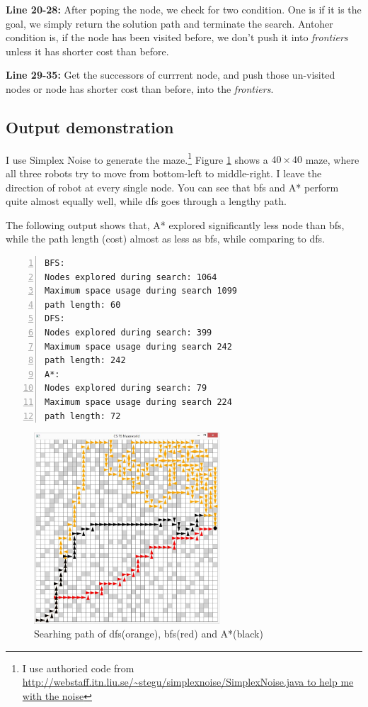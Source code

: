 \documentclass{article}
\begin{document}
\textbf{Line 20-28:} After poping the node, we check for two condition. One is if it is the goal, we simply return the solution path and terminate the search. Antoher condition is, if the node has been visited before, we don't push it into \emph{frontiers} unless it has shorter cost than before.

\textbf{Line 29-35:} Get the successors of currrent node, and push those un-visited nodes or node has shorter cost than before, into the \emph{frontiers}.



\subsection{Output demonstration}



I use Simplex Noise to generate the maze.\footnote{I use authoried code from \url{http://webstaff.itn.liu.se/~stegu/simplexnoise/SimplexNoise.java to help me with the noise}} Figure \ref{s-1} shows a $40\times40$ maze, where all three robots try to move from bottom-left to middle-right. I leave the direction of robot at every single node. You can see that bfs and A* perform quite almost equally well, while dfs goes through a lengthy path.

The following output shows that, A* explored significantly less node than bfs, while the path length (cost) almost as less as bfs, while comparing to dfs.



\begin{lstlisting}[numbers=left]
BFS:
Nodes explored during search: 1064
Maximum space usage during search 1099
path length: 60
DFS:
Nodes explored during search: 399
Maximum space usage during search 242
path length: 242
A*:
Nodes explored during search: 79
Maximum space usage during search 224
path length: 72
\end{lstlisting}


\begin{figure}[!h]
\centering
\includegraphics[width=0.618\textwidth]{s-1-1.JPG}
\caption{Searhing path of dfs(orange), bfs(red) and A*(black)}
\label{s-1}
\end{figure}
\end{document}
